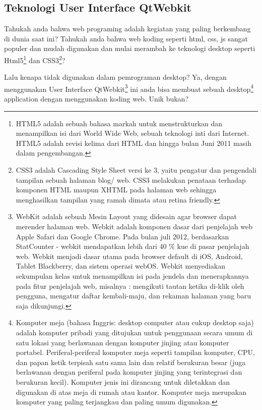 \subsection{Teknologi User Interface QtWebkit}\label{teknologi-user-interface-qtwebkit}

Tahukah anda bahwa web programing adalah kegiatan yang paling berkembang
di dunia saat ini? Tahukah anda bahwa web koding seperti html, css, js
sangat populer dan mudah digunakan dan mulai merambah ke teknologi
desktop seperti Html5\footnote{HTML5 adalah sebuah bahasa markah untuk menstrukturkan dan menampilkan isi dari World Wide Web, sebuah teknologi inti dari Internet. HTML5 adalah revisi kelima dari HTML dan hingga bulan Juni 2011 masih dalam pengembangan.} dan CSS3\footnote{CSS3 adalah Cascading Style Sheet versi ke 3, yaitu pengatur dan pengendali tampilan sebuah halaman blog/ web. CSS3 melakukan penataan terhadap komponen HTML maupun XHTML pada halaman web sehingga menghasilkan tampilan yang ramah dimata atau retina friendly.}?

Lalu kenapa tidak digunakan dalam pemrograman desktop? Ya, dengan
menggunakan User Interface QtWebkit\footnote{WebKit adalah sebuah Mesin Layout yang didesain agar browser dapat merender halaman web. Webkit adalah komponen dasar dari penjelajah web Apple Safari dan Google Chrome. Pada bulan juli 2012, berdasarkan StatCounter - webkit mendapatkan lebih dari 40 \% kue di pasar penjelajah web. Webkit menjadi dasar utama pada browser default di iOS, Android, Tablet Blackberry, dan sistem operasi webOS. Webkit menyediakan sekumpulan kelas untuk menampilkan isi pada jendela dan menerapkannya pada fitur penjelajah web, misalnya : mengikuti tautan ketika di-klik oleh pengguna, mengatur daftar kembali-maju, dan rekaman halaman yang baru saja dikunjungi.} ini anda bisa membuat sebuah desktop\footnote{Komputer meja (bahasa Inggris: desktop computer atau cukup desktop saja) adalah komputer pribadi yang ditujukan untuk penggunaan secara umum di satu lokasi yang berlawanan dengan komputer jinjing atau komputer portabel. Periferal-periferal komputer meja seperti tampilan komputer, CPU, dan papan ketik terpisah satu sama lain dan relatif berukuran besar (juga berlawanan dengan periferal pada komputer jinjing yang terintegrasi dan berukuran kecil). Komputer jenis ini dirancang untuk diletakkan dan digunakan di atas meja di rumah atau kantor. Komputer meja merupakan komputer yang paling terjangkau dan paling umum digunakan.}
application dengan menggunakan koding web. Unik bukan?

